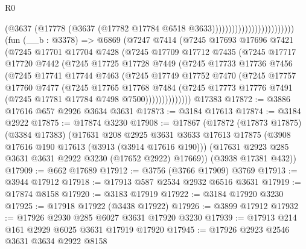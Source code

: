 \begin{lexlean}{R0}
\begin{coremodule}
                                              (@3637
                                                (@17778
                                                  (@3637
                                                    (@17782
                                                      @17784
                                                      @6518
                                                      @3633)))))))))))))))))))))))))
    (fun (__b : @3378) =>
    @6869
      (@7247
        @7414
        (@7245
          @17693
          @17696
          @7421
          (@7245
            @17701
            @17704
            @7428
            (@7245
              @17709
              @17712
              @7435
              (@7245
                @17717
                @17720
                @7442
                (@7245
                  @17725
                  @17728
                  @7449
                  (@7245
                    @17733
                    @17736
                    @7456
                    (@7245
                      @17741
                      @17744
                      @7463
                      (@7245
                        @17749
                        @17752
                        @7470
                        (@7245
                          @17757
                          @17760
                          @7477
                          (@7245
                            @17765
                            @17768
                            @7484
                            (@7245
                              @17773
                              @17776
                              @7491
                              (@7245 @17781 @17784 @7498 @7500))))))))))))))
    @17383
@17872 := @3886 @17616 @657 @2926 @3634 @3631
@17873 := @3184 @17613
@17874 := @3184 @2922
@17875 := @17874 @3230
@17908 := @17867
    (@17872
      (@17873 @17875)
      (@3384 @17383)
      (@17631
        @208
        @2925
        @3631
        @3633
        @17613
        @17875
        (@3908 @17616 @190 @17613 (@3913 (@3914 @17616 @190)))
        (@17631 @2923 @285 @3631 @3631 @2922 @3230 (@17652 @2922) @17669))
      (@3938 @17381 @432))
@17909 := @662 @17689
@17912 := @3756 (@3766 @17909) @3769
@17913 := @3944 @17912
@17918 := @17913 @587 @2534 @2932 @6516 @3631
@17919 := @17874 @8158
@17920 := @3183 @17919
@17922 := @3184 @17920 @3230
@17925 := @17918 @17922 (@3438 @17922)
@17926 := @3899 @17912
@17932 := @17926 @2930 @285 @6027 @3631 @17920 @3230
@17939 := @17913 @214 @161 @2929 @6025 @3631 @17919 @17920
@17945 := @17926 @2923 @2546 @3631 @3634 @2922 @8158

\end{coremodule}
\end{lexlean}
